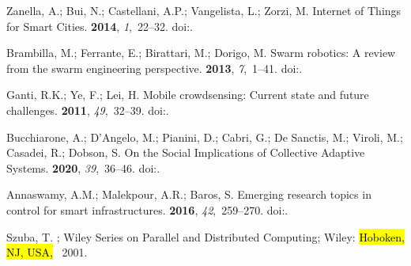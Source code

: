 \documentclass[jsan,article,accept,moreauthors,pdftex]{Definitions/mdpi}
\begin{document}
\begin{thebibliography}{999}
Zanella, A.; Bui, N.; Castellani, A.P.; Vangelista, L.; Zorzi, M.
\newblock Internet of Things for Smart Cities.
 {\bf 2014}, {\em 1},~22--32.
\newblock
  doi:{\href{https://doi.org/10.1109/JIOT.2014.2306328}{}}.

Brambilla, M.; Ferrante, E.; Birattari, M.; Dorigo, M.
\newblock Swarm robotics: A review from the swarm engineering perspective.
 {\bf 2013}, {\em 7},~1--41.
\newblock
  doi:{\href{https://doi.org/10.1007/s11721-012-0075-2}{}}.

Ganti, R.K.; Ye, F.; Lei, H.
\newblock Mobile crowdsensing: Current state and future challenges.
 {\bf 2011}, {\em 49},~32--39.
\newblock
  doi:{\href{https://doi.org/10.1109/MCOM.2011.6069707}{}}.

Bucchiarone, A.; D'Angelo, M.; Pianini, D.; Cabri, G.; {De Sanctis}, M.;
  Viroli, M.; Casadei, R.; Dobson, S.
\newblock On the Social Implications of Collective Adaptive Systems.
 {\bf 2020}, {\em 39},~36--46.
\newblock
  doi:{\href{https://doi.org/10.1109/MTS.2020.3012324}{}}.

Annaswamy, A.M.; Malekpour, A.R.; Baros, S.
\newblock Emerging research topics in control for smart infrastructures.
 {\bf 2016}, {\em 42},~259--270.
\newblock
  doi:{\href{https://doi.org/10.1016/j.arcontrol.2016.10.001}{}}.

Szuba, T.
; Wiley Series on Parallel
  and Distributed Computing; Wiley:  \hl{Hoboken, NJ, USA,}~ 2001.%


\end{thebibliography}
\end{document}
